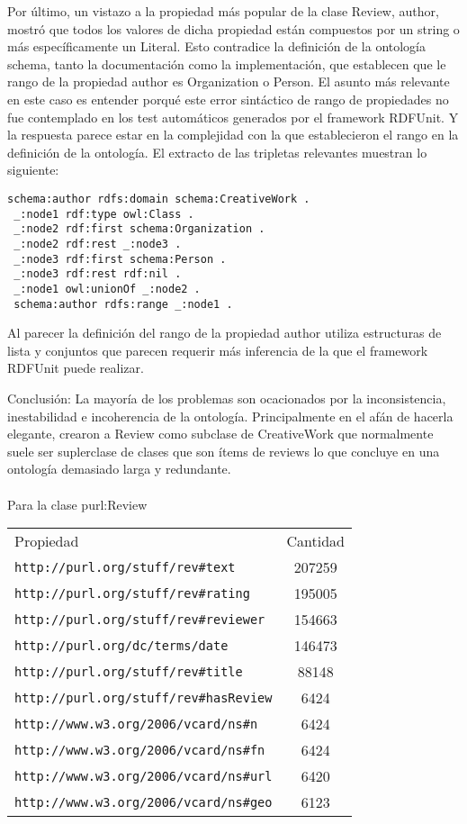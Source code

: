  Por último, un vistazo a la propiedad más popular de la clase Review, author, mostró que todos los valores de dicha propiedad están compuestos 
 por un string o más específicamente un Literal. Esto contradice la definición de la ontología schema, tanto la documentación como la implementación, que
 establecen que le rango de la propiedad author es Organization o Person. 
 El asunto más relevante en este caso es entender porqué este error sintáctico de rango de propiedades no fue contemplado en los test 
 automáticos generados por el framework RDFUnit.
 Y la respuesta parece estar en la complejidad con la que establecieron el rango en la definición de la ontología. El extracto de las 
 tripletas relevantes muestran lo siguiente:
 \begin{lstlisting}[frame=single]
 schema:author rdfs:domain schema:CreativeWork .
 _:node1 rdf:type owl:Class .
 _:node2 rdf:first schema:Organization .
 _:node2 rdf:rest _:node3 .
 _:node3 rdf:first schema:Person .
 _:node3 rdf:rest rdf:nil .
 _:node1 owl:unionOf _:node2 .
 schema:author rdfs:range _:node1 .
 \end{lstlisting}
 
 Al parecer la definición del rango de la propiedad author utiliza estructuras de lista y conjuntos que parecen requerir más inferencia de la 
 que el framework RDFUnit puede realizar.
 
 Conclusión: La mayoría de los problemas son ocacionados por la inconsistencia, inestabilidad e incoherencia de la ontología. Principalmente 
 en el afán de hacerla elegante, crearon a Review como subclase de CreativeWork que normalmente suele ser suplerclase de clases que son ítems de reviews
 lo que concluye en una ontología demasiado larga y redundante.
 \\
 \\
 Para la clase purl:Review\\
 \begin{tabular}{| l | c | }
 Propiedad & Cantidad \\
 \verb|http://purl.org/stuff/rev#text| & 207259\\
 \verb|http://purl.org/stuff/rev#rating| & 195005\\
 \verb|http://purl.org/stuff/rev#reviewer| & 154663\\
 \verb|http://purl.org/dc/terms/date| & 146473\\
 \verb|http://purl.org/stuff/rev#title| & 88148\\
 \verb|http://purl.org/stuff/rev#hasReview| & 6424\\
 \verb|http://www.w3.org/2006/vcard/ns#n| & 6424\\
 \verb|http://www.w3.org/2006/vcard/ns#fn| & 6424\\
 \verb|http://www.w3.org/2006/vcard/ns#url| & 6420\\
 \verb|http://www.w3.org/2006/vcard/ns#geo| & 6123
\end{tabular}
\\ 

